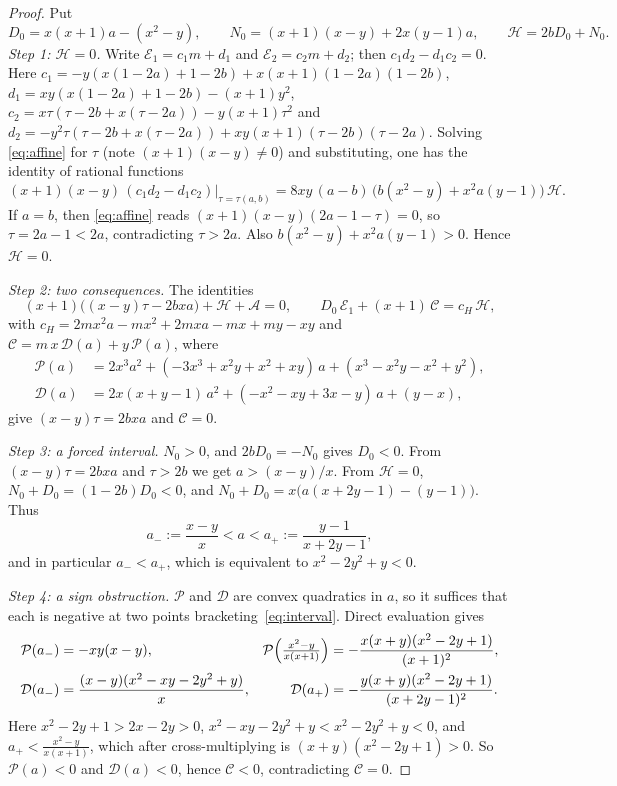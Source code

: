 \begin{proof}
Put
\[
  D_0=x(x+1)a-(x^2-y),\qquad N_0=(x+1)(x-y)+2x(y-1)a,\qquad
  \mathcal H=2bD_0+N_0 .
\]
\emph{Step 1: $\mathcal H=0$.} Write $\mathcal E_1=c_1m+d_1$ and
$\mathcal E_2=c_2m+d_2$; then $c_1d_2-d_1c_2=0$. Here
$c_1=-y(x(1-2a)+1-2b)+x(x+1)(1-2a)(1-2b)$,
$d_1=xy(x(1-2a)+1-2b)-(x+1)y^2$,
$c_2=x\tau(\tau-2b+x(\tau-2a))-y(x+1)\tau^2$ and
$d_2=-y^2\tau(\tau-2b+x(\tau-2a))+xy(x+1)(\tau-2b)(\tau-2a)$. Solving
\eqref{eq:affine} for $\tau$ (note $(x+1)(x-y)\ne0$) and substituting, one has
the identity of rational functions
\begin{equation}\label{eq:resultant}
  (x+1)(x-y)\,(c_1d_2-d_1c_2)\big|_{\tau=\tau(a,b)}
  =8xy\,(a-b)\,\bigl(b(x^2-y)+x^2a(y-1)\bigr)\,\mathcal H.
\end{equation}
If $a=b$, then \eqref{eq:affine} reads $(x+1)(x-y)(2a-1-\tau)=0$, so
$\tau=2a-1<2a$, contradicting $\tau>2a$. Also $b(x^2-y)+x^2a(y-1)>0$. Hence
$\mathcal H=0$.

\emph{Step 2: two consequences.} The identities
\[
  (x+1)\bigl((x-y)\tau-2bxa\bigr)+\mathcal H+\mathcal A=0,
  \qquad
  D_0\,\mathcal E_1+(x+1)\,\mathcal C=c_H\,\mathcal H,
\]
with $c_H=2mx^2a-mx^2+2mxa-mx+my-xy$ and
$\mathcal C=m\,x\,\mathcal D(a)+y\,\mathcal P(a)$, where
\begin{align*}
  \mathcal P(a)&=2x^3a^2+(-3x^3+x^2y+x^2+xy)\,a+(x^3-x^2y-x^2+y^2),\\
  \mathcal D(a)&=2x(x+y-1)\,a^2+(-x^2-xy+3x-y)\,a+(y-x),
\end{align*}
give $(x-y)\tau=2bxa$ and $\mathcal C=0$.

\emph{Step 3: a forced interval.} $N_0>0$, and $2bD_0=-N_0$ gives $D_0<0$.
From $(x-y)\tau=2bxa$ and $\tau>2b$ we get $a>(x-y)/x$. From $\mathcal H=0$,
$N_0+D_0=(1-2b)D_0<0$, and $N_0+D_0=x\bigl(a(x+2y-1)-(y-1)\bigr)$. Thus
\begin{equation}\label{eq:interval}
  a_-:=\frac{x-y}{x}<a<a_+:=\frac{y-1}{x+2y-1},
\end{equation}
and in particular $a_-<a_+$, which is equivalent to $x^2-2y^2+y<0$.

\emph{Step 4: a sign obstruction.} $\mathcal P$ and $\mathcal D$ are convex
quadratics in $a$, so it suffices that each is negative at two points
bracketing~\eqref{eq:interval}. Direct evaluation gives
\begin{align*}
  \mathcal P(a_-)&=-xy(x-y), &
  \mathcal P\Bigl(\tfrac{x^2-y}{x(x+1)}\Bigr)&=-\frac{x(x+y)(x^2-2y+1)}{(x+1)^2},\\
  \mathcal D(a_-)&=\frac{(x-y)(x^2-xy-2y^2+y)}{x}, &
  \mathcal D(a_+)&=-\frac{y(x+y)(x^2-2y+1)}{(x+2y-1)^2}.
\end{align*}
Here $x^2-2y+1>2x-2y>0$, $x^2-xy-2y^2+y<x^2-2y^2+y<0$, and
$a_+<\frac{x^2-y}{x(x+1)}$, which after cross-multiplying is
$(x+y)(x^2-2y+1)>0$. So $\mathcal P(a)<0$ and $\mathcal D(a)<0$, hence
$\mathcal C<0$, contradicting $\mathcal C=0$.
\end{proof}
